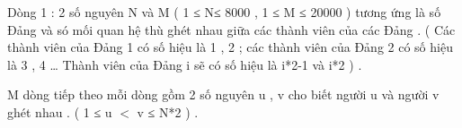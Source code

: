 Dòng 1 : 2 số nguyên N và M ( 1 ≤ N≤ 8000 , 1 ≤ M ≤ 20000 ) tương ứng là số Đảng và só mối quan hệ thù ghét nhau giữa các thành viên của các Đảng . ( Các thành viên của Đảng 1 có số hiệu là 1 , 2 ; các thành viên của Đảng 2 có số hiệu là 3 , 4 … Thành viên của Đảng i sẽ có số hiệu là i*2-1 và i*2 ) .   


   M dòng tiếp theo mỗi dòng gồm 2 số nguyên u , v cho biết người u và người v ghét nhau . ( 1 ≤ u $<$ v ≤ N*2 ) .